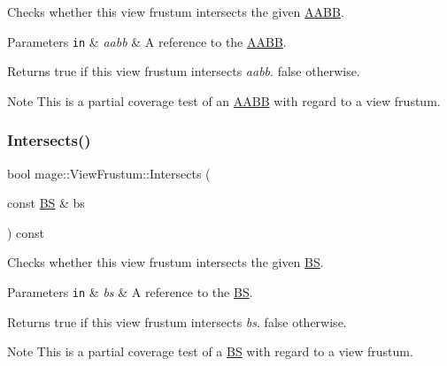 Checks whether this view frustum intersects the given \hyperlink{structmage_1_1_a_a_b_b}{A\+A\+BB}.


\begin{DoxyParams}[1]{Parameters}
\mbox{\tt in}  & {\em aabb} & A reference to the \hyperlink{structmage_1_1_a_a_b_b}{A\+A\+BB}. \\
\hline
\end{DoxyParams}
\begin{DoxyReturn}{Returns}
{\ttfamily true} if this view frustum intersects {\itshape aabb}. {\ttfamily false} otherwise. 
\end{DoxyReturn}
\begin{DoxyNote}{Note}
This is a partial coverage test of an \hyperlink{structmage_1_1_a_a_b_b}{A\+A\+BB} with regard to a view frustum. 
\end{DoxyNote}
\hypertarget{structmage_1_1_view_frustum_a2925f619827d284c86ea5a68e694a8a8}{}\label{structmage_1_1_view_frustum_a2925f619827d284c86ea5a68e694a8a8} 
\subsubsection{\texorpdfstring{Intersects()}{Intersects()}\hspace{0.1cm}{\footnotesize\ttfamily [4/4]}}
{\footnotesize\ttfamily bool mage\+::\+View\+Frustum\+::\+Intersects (\begin{DoxyParamCaption}\item[{const \hyperlink{structmage_1_1_b_s}{BS} \&}]{bs }\end{DoxyParamCaption}) const\hspace{0.3cm}{\ttfamily [noexcept]}}

Checks whether this view frustum intersects the given \hyperlink{structmage_1_1_b_s}{BS}.


\begin{DoxyParams}[1]{Parameters}
\mbox{\tt in}  & {\em bs} & A reference to the \hyperlink{structmage_1_1_b_s}{BS}. \\
\hline
\end{DoxyParams}
\begin{DoxyReturn}{Returns}
{\ttfamily true} if this view frustum intersects {\itshape bs}. {\ttfamily false} otherwise. 
\end{DoxyReturn}
\begin{DoxyNote}{Note}
This is a partial coverage test of a \hyperlink{structmage_1_1_b_s}{BS} with regard to a view frustum. 
\end{DoxyNote}
\hypertarget{structmage_1_1_view_frustum_add514821f691117c0ab139c13f86ef70}{}\label{structmage_1_1_view_frustum_add514821f691117c0ab139c13f86ef70} 
